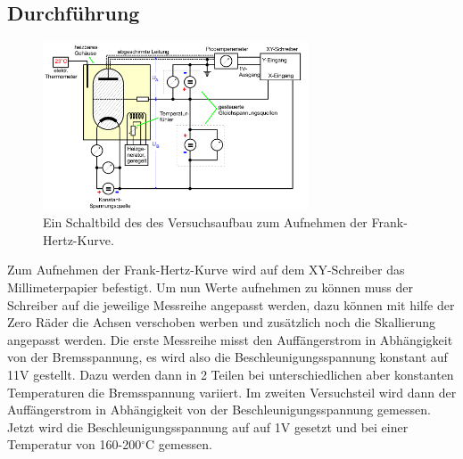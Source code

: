     \subsection{Durchführung}

        \begin{figure}[ht]
            \centering
            \includegraphics[width=0.7\textwidth]{latex/images/Schaltbild.PNG}
            \caption{Ein Schaltbild des des Versuchsaufbau zum Aufnehmen der Frank-Hertz-Kurve.}
            \label{img:Term}
        \end{figure}

        \noindent Zum Aufnehmen der Frank-Hertz-Kurve wird auf dem XY-Schreiber das Millimeterpapier befestigt. Um nun Werte aufnehmen zu können
        muss der Schreiber auf die jeweilige Messreihe angepasst werden, dazu können mit hilfe der Zero Räder die Achsen verschoben werben und 
        zusätzlich noch die Skallierung angepasst werden. Die erste Messreihe misst den Auffängerstrom in Abhängigkeit von der Bremsspannung, es 
        wird also die Beschleunigungsspannung konstant auf 11V gestellt. Dazu werden dann in 2 Teilen bei unterschiedlichen aber konstanten 
        Temperaturen die Bremsspannung variiert.
        Im zweiten Versuchsteil wird dann der Auffängerstrom in Abhängigkeit von der Beschleunigungsspannung gemessen. Jetzt wird die 
        Beschleunigungsspannung auf auf 1V gesetzt und bei einer Temperatur von 160-200$^\circ$C gemessen. 





        
        